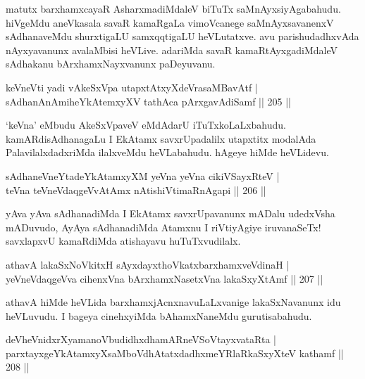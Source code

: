 \begin{artha}%
matutx barxhamxcayaR AsharxmadiMdaleV biTuTx saMnAyxsiyAgabahudu. hiVgeMdu aneVkasala savaR kamaRgaLa vimoVcanege saMnAyxsavanenxV sAdhanaveMdu shurxtigaLU samxqqtigaLU heVLutatxve. avu parishudadhxvAda nAyxyavanunx avalaMbisi heVLive. adariMda savaR kamaRtAyxgadiMdaleV sAdhakanu bArxhamxNayxvanunx paDeyuvanu.
\end{artha}

\begin{shl}
keVneVti yadi vA\s \s keSxVpa utapxtAtxyXdeVrasaMBavAtf |\\
sAdhanAnAmiheYkAtemxyXV tathAca pArxgavAdiSamf \hfill || 205 ||
\end{shl}

\begin{artha}
`keVna' eMbudu AkeSxVpaveV eMdAdarU iTuTxkoLaLxbahudu. kamARdi\-sAdhanagaLu I EkAtamx savxrUpadalilx utapxtitx modalAda PalavilalxdadxriMda ilalxveMdu heVLabahudu. hAgeye hiMde heVLidevu.
\end{artha}


\begin{shl}
sAdhaneVneYtadeYkAtamxyXM yeVna yeVna cikiVSayxRteV |\\
teVna teVneVdaqgeVvA\s \s tAmx nAtishiVtimaRnAgapi \hfill || 206 ||
\end{shl}

\begin{artha}
yAva yAva sAdhanadiMda I EkAtamx savxrUpavanunx mADalu udedxVsha mADuvudo, AyAya sAdhanadiMda Atamxnu I riVtiyAgiye iruvanaSeTx! savxlapxvU kamaRdiMda atishayavu huTuTxvudilalx.
\end{artha}

\begin{shl}
athavA lakaSxNoVkitxH sAyxdayxthoVkatxbarxhamxveVdinaH |\\
yeVneVdaqgeVva cihenxVna bArxhamxNasetxVna lakaSxyXtAmf \hfill || 207 ||
\end{shl}

\begin{artha}%
athavA hiMde heVLida barxhamxjAcnxnavuLaLxvanige lakaSxNavanunx idu heVLuvudu. I bageya cinehxyiMda bAhamxNaneMdu gurutisabahudu.
\end{artha}

\begin{shl}
deVheVnidxrXyamanoVbudidhxdhamARneVSoV\s tayxvataRta |\\
parxtayxgeYkAtamxyXsaMboVdhAtatxdadhxmeYRlaRkaSxyXteV kathamf \hfill || 208 ||
\end{shl}

